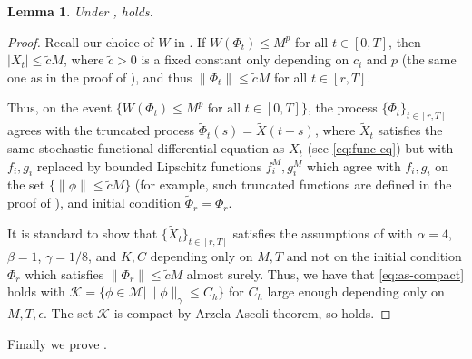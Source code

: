 \documentclass[final]{amsart}
\newtheorem{lem}[thm]{Lemma}
\numberwithin{thm}{section}
\numberwithin{equation}{section}
\newcommand{\mcM}{\mathcal{M}}
\newcommand{\K}{\mathcal{K}}
\begin{document}
\begin{lem}\label{functional-compact-holds}
    Under ,  holds.
\end{lem}

\begin{proof}
    Recall our choice of $W$ in . If $W(\Phi_t) \leq M^p$ for all $t \in [0,T]$, then $|X_t| \leq \tilde{c}M$, where $\tilde{c} > 0$ is a fixed constant only depending on $c_i$ and $p$ (the same one as in the proof of ), and thus $\|\Phi_t\| \leq \tilde{c}M$ for all $t \in [r,T]$. 
    
    Thus, on the event $\{W(\Phi_t) \leq M^p \textrm{ for all } t \in [0,T]\}$, the process $\{\Phi_t\}_{t \in [r,T]}$ agrees with the truncated process $\tilde{\Phi}_t(s) = \tilde{X}(t+s)$, where $\tilde{X}_t$ satisfies the same stochastic functional differential equation as $X_t$ (see \eqref{eq:func-eq}) but with $f_i,g_i$ replaced by bounded Lipschitz functions $f_i^M, g_i^M$ which agree with $f_i,g_i$ on the set $\{\|\phi\| \leq \tilde{c}M \}$ (for example, such truncated functions are defined in the proof of \cite[Lemma 3.3]{functional}), and initial condition $\tilde{\Phi}_{r} = \Phi_r$. 
    
    It is standard to show that $\{\tilde{X}_t\}_{t \in [r,T]}$ satisfies the assumptions of  with $\alpha = 4$, $\beta = 1$, $\gamma = 1/8$, and $K,C$ depending only on $M,T$ and not on the initial condition $\Phi_r$ which satisfies $\|\Phi_r\| \leq \tilde{c}M$ almost surely. Thus, we have that \eqref{eq:as-compact} holds with $\K = \{\phi \in \mcM \mid \|\phi\|_\gamma \leq C_h \}$ for $C_h$ large enough depending only on $M,T,\epsilon$. The set $\K$ is compact by Arzela-Ascoli theorem, so  holds.
\end{proof}

Finally we prove .
\end{document}
